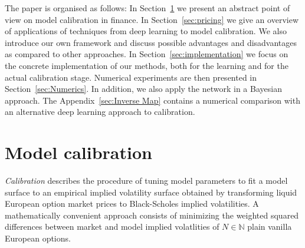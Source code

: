 \documentclass{article}
\theoremstyle{remark}
\begin{document}


The paper is organised as follows:
In Section~\ref{sec:an-abstract-view} we present an
abstract point of view on model calibration in finance.
In Section~\ref{sec:pricing} we give an overview of applications of techniques
from deep learning to model calibration.
We also introduce our own framework
and discuss possible advantages and disadvantages as compared to other
approaches.
In Section~\ref{sec:implementation} we focus on the concrete implementation of our methods,
both for the learning and for the actual calibration stage.
Numerical experiments are then presented in Section~\ref{sec:Numerics}. In addition, we also apply the network in a
Bayesian approach. The Appendix~\ref{sec:Inverse Map} contains a numerical
comparison with an alternative deep learning approach to calibration.

\section{Model calibration}
\label{sec:an-abstract-view}

\emph{Calibration} describes the procedure of tuning model parameters to fit
a model surface to an empirical implied volatility surface obtained by
transforming liquid European option market prices to Black-Scholes implied
volatilities. A mathematically convenient approach consists of minimizing the
weighted squared differences between market and model implied volatlities of
$N \in \mathbb{N}$ plain vanilla European options.
\end{document}
